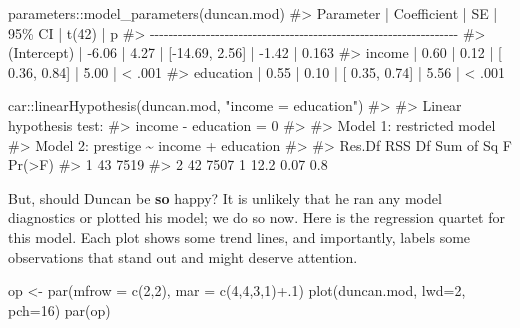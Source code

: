 \documentclass[
  letterpaper,
  10pt,
  krantz2]{krantz}
\makeatletter
\newenvironment{Shaded}{\begin{snugshade}}{\end{snugshade}}
\newcommand{\AttributeTok}[1]{\textcolor[rgb]{0.40,0.45,0.13}{#1}}
\newcommand{\CommentTok}[1]{\textcolor[rgb]{0.37,0.37,0.37}{#1}}
\newcommand{\DecValTok}[1]{\textcolor[rgb]{0.68,0.00,0.00}{#1}}
\newcommand{\FunctionTok}[1]{\textcolor[rgb]{0.28,0.35,0.67}{#1}}
\newcommand{\NormalTok}[1]{\textcolor[rgb]{0.00,0.23,0.31}{#1}}
\newcommand{\OtherTok}[1]{\textcolor[rgb]{0.00,0.23,0.31}{#1}}
\newcommand{\SpecialCharTok}[1]{\textcolor[rgb]{0.37,0.37,0.37}{#1}}
\newcommand{\StringTok}[1]{\textcolor[rgb]{0.13,0.47,0.30}{#1}}
\newenvironment{kframe}{%
  \medskip{}
  \setlength{\fboxsep}{.8em}
  \def\at@end@of@kframe{}%
  \ifinner\ifhmode%
  \def\at@end@of@kframe{\end{minipage}}%
  \begin{minipage}{\columnwidth}%
  \fi\fi%
  \def\FrameCommand##1{\hskip\@totalleftmargin \hskip-\fboxsep
  \colorbox{shadecolor}{##1}\hskip-\fboxsep
      \hskip-\linewidth \hskip-\@totalleftmargin \hskip\columnwidth}%
  \MakeFramed {\advance\hsize-\width
    \@totalleftmargin\z@ \linewidth\hsize
    \@setminipage}}%
{\par\unskip\endMakeFramed%
  \at@end@of@kframe}
\renewenvironment{Shaded}{\begin{kframe}}{\end{kframe}}
\makeatother
\begin{document}
\begin{Shaded}
\begin{Highlighting}[]
\NormalTok{parameters}\SpecialCharTok{::}\FunctionTok{model\_parameters}\NormalTok{(duncan.mod)}
\CommentTok{\#\textgreater{} Parameter   | Coefficient |   SE |         95\% CI | t(42) |      p}
\CommentTok{\#\textgreater{} {-}{-}{-}{-}{-}{-}{-}{-}{-}{-}{-}{-}{-}{-}{-}{-}{-}{-}{-}{-}{-}{-}{-}{-}{-}{-}{-}{-}{-}{-}{-}{-}{-}{-}{-}{-}{-}{-}{-}{-}{-}{-}{-}{-}{-}{-}{-}{-}{-}{-}{-}{-}{-}{-}{-}{-}{-}{-}{-}{-}{-}{-}{-}{-}{-}{-}}
\CommentTok{\#\textgreater{} (Intercept) |       {-}6.06 | 4.27 | [{-}14.69, 2.56] | {-}1.42 | 0.163 }
\CommentTok{\#\textgreater{} income      |        0.60 | 0.12 | [  0.36, 0.84] |  5.00 | \textless{} .001}
\CommentTok{\#\textgreater{} education   |        0.55 | 0.10 | [  0.35, 0.74] |  5.56 | \textless{} .001}

\NormalTok{car}\SpecialCharTok{::}\FunctionTok{linearHypothesis}\NormalTok{(duncan.mod, }\StringTok{"income = education"}\NormalTok{)}
\CommentTok{\#\textgreater{} }
\CommentTok{\#\textgreater{} Linear hypothesis test:}
\CommentTok{\#\textgreater{} income {-} education = 0}
\CommentTok{\#\textgreater{} }
\CommentTok{\#\textgreater{} Model 1: restricted model}
\CommentTok{\#\textgreater{} Model 2: prestige \textasciitilde{} income + education}
\CommentTok{\#\textgreater{} }
\CommentTok{\#\textgreater{}   Res.Df  RSS Df Sum of Sq    F Pr(\textgreater{}F)}
\CommentTok{\#\textgreater{} 1     43 7519                         }
\CommentTok{\#\textgreater{} 2     42 7507  1      12.2 0.07    0.8}
\end{Highlighting}
\end{Shaded}

But, should Duncan be \textbf{so} happy? It is unlikely that he ran any
model diagnostics or plotted his model; we do so now. Here is the
regression quartet for this model. Each plot shows some trend lines, and
importantly, labels some observations that stand out and might deserve
attention.

\begin{Shaded}
\begin{Highlighting}[]
\NormalTok{op }\OtherTok{\textless{}{-}} \FunctionTok{par}\NormalTok{(}\AttributeTok{mfrow =} \FunctionTok{c}\NormalTok{(}\DecValTok{2}\NormalTok{,}\DecValTok{2}\NormalTok{), }
          \AttributeTok{mar =} \FunctionTok{c}\NormalTok{(}\DecValTok{4}\NormalTok{,}\DecValTok{4}\NormalTok{,}\DecValTok{3}\NormalTok{,}\DecValTok{1}\NormalTok{)}\SpecialCharTok{+}\NormalTok{.}\DecValTok{1}\NormalTok{)}
\FunctionTok{plot}\NormalTok{(duncan.mod, }\AttributeTok{lwd=}\DecValTok{2}\NormalTok{, }\AttributeTok{pch=}\DecValTok{16}\NormalTok{)}
\FunctionTok{par}\NormalTok{(op)}
\end{Highlighting}
\end{Shaded}
\end{document}
